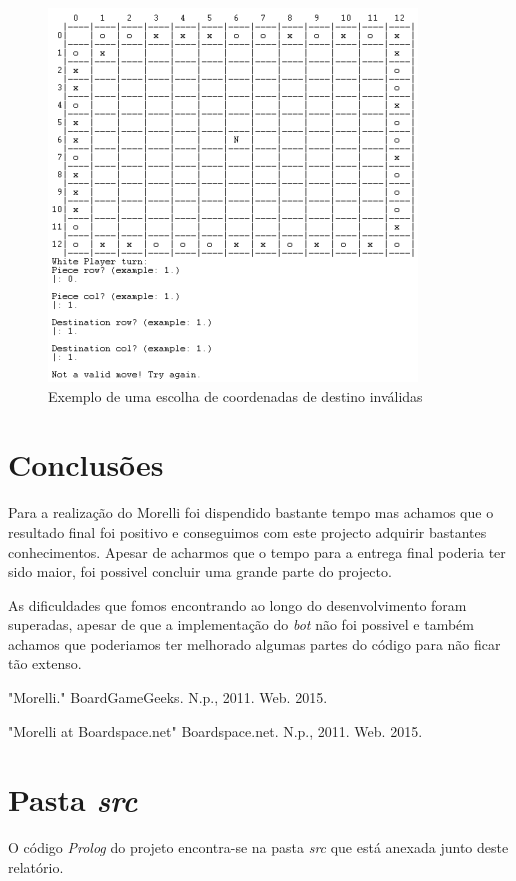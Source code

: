 \documentclass[a4paper]{article}
\begin{document}
\begin{figure}
\begin{center}
\hspace*{-0.5cm}\includegraphics[scale=1]{game3.png}
\caption{Exemplo de uma escolha de coordenadas de destino inválidas}
\end{center}
\end{figure}

\newpage
\section{Conclusões}
Para a realização do Morelli foi dispendido bastante tempo mas achamos que o resultado final foi positivo e conseguimos com este projecto adquirir bastantes conhecimentos. Apesar de acharmos que o tempo para a entrega final poderia ter sido maior, foi possivel concluir uma grande parte do projecto. 
\par As dificuldades que fomos encontrando ao longo do desenvolvimento foram superadas, apesar de que a implementação do \textit{bot} não foi possivel e também achamos que poderiamos ter melhorado algumas partes do código para não ficar tão extenso. 



\clearpage
{}
\renewcommand\refname{Bibliografia}


\par "Morelli." BoardGameGeeks. N.p., 2011. Web. 2015.
\par "Morelli at Boardspace.net"  Boardspace.net. N.p., 2011. Web. 2015.

\newpage
\appendix
\section{Pasta \textit{src}}
O código \textit{Prolog} do projeto encontra-se na pasta \textit{src} que está anexada junto deste relatório.
\end{document}
